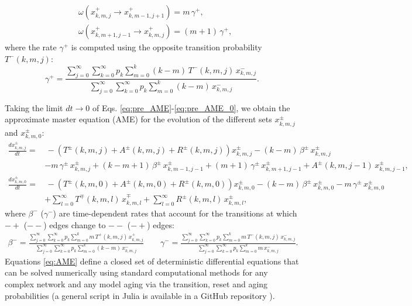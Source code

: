 \begin{align} \label{rate_gamma_s}
    &  \omega (x^{+}_{k,m,j} \to x^{+}_{k,m-1,j+1}) = m\, \gamma^{+}, \nonumber \\
    & \omega (x^{+}_{k,m+1,j-1} \to x^{+}_{k,m,j}) = (m + 1)\, \gamma^{+} ,
\end{align}
where the rate $\gamma^{+}$ is computed using the opposite transition probability $T^{-}(k,m,j)$:
\begin{equation}
        \label{gamma_s}
        \gamma^{+} = \frac{\sum_{j=0}^{\infty} \sum_{k=0}^{\infty} p_k \sum_{m = 0}^{k} (k - m)\, T^{-} (k,m,j) \, x^{-}_{k,m,j}}{\sum_{j=0}^{\infty} \sum_{k=0}^{\infty} p_k \sum_{m = 0}^{k} (k - m)\,  x^{-}_{k,m,j}}.
\end{equation}
    
Taking the limit $dt \to 0$ of Eqs. \eqref{eq:pre_AME}-\eqref{eq:pre_AME_0}, we obtain the approximate master equation (AME) for the evolution of the different sets $x^{\pm}_{k,m,j}$ and $x^{\pm}_{k,m,0}$:
\begin{align}
\label{eq:AME}
    \frac{d x^{\pm}_{k,m,j}}{dt} = & \, - \left( T^{\pm} (k,m,j) + A^{\pm} (k,m,j) + R^{\pm} (k,m,j) \right) x^{\pm}_{k,m,j} - (k - m)\, \beta^{\pm}\,  x^{\pm}_{k,m,j} \nonumber\\
    & - m \, \gamma^{\pm}\, x^{\pm}_{k,m,j} + (k-m+1)\, \beta^{\pm} \,   x^{\pm}_{k,m-1,j-1} + (m+1)\, \gamma^{\pm} \,  x^{\pm}_{k,m+1,j-1} + A^{\pm} (k,m,j-1)\,  x^{\pm}_{k,m,j-1},  \\
    \frac{d x^{\pm}_{k,m,0}}{dt}  = & \, - \left( T^{\pm} (k,m,0) + A^{\pm} (k,m,0) + R^{\pm} (k,m,0) \right) x^{\pm}_{k,m,0} - (k - m) \, \beta^{\pm}\,  x^{\pm}_{k,m,0} - m\, \gamma^{\pm} \,  x^{\pm}_{k,m,0}\nonumber\\
    & + \sum_{l = 0}^{\infty} T^{\mp} (k,m,l)\,  x^{\mp}_{k,m,l} + \sum_{l = 0}^{\infty} R^{\pm} (k,m,l)\, x^{\pm}_{k,m,l},\nonumber
\end{align}
where $\beta^{-}$ ($\gamma^{-}$) are time-dependent rates that account for the transitions at which $-+$ ($--$) edges change to $--$ ($-+$) edges:
\begin{align}
    \beta^{-} = \frac{\sum_{j=0}^{\infty} \sum_{k=0}^{\infty} p_k \sum_{m = 0}^{k} m \, T^{+} (k,m,j) \, x^{+}_{k,m,j}}{\sum_{j=0}^{\infty} \sum_{k=0}^{\infty} p_k \sum_{m = 0}^{k} (k - m)\,  x^{-}_{k,m,j}} \quad \quad \gamma^{-} = \frac{\sum_{j=0}^{\infty} \sum_{k=0}^{\infty} p_k \sum_{m = 0}^{k} m\, T^{-} (k,m,j) \, x^{-}_{k,m,j}}{\sum_{j=0}^{\infty} \sum_{k=0}^{\infty} p_k \sum_{m = 0}^{k} m\,  x^{-}_{k,m,j}}.
\end{align}
Equations \ref{eq:AME} define a closed set of deterministic differential equations that can be solved numerically using standard computational methods for any complex network and any model aging via the transition, reset and aging probabilities (a general script in Julia is available in a GitHub repository \cite{link_git}).
    
